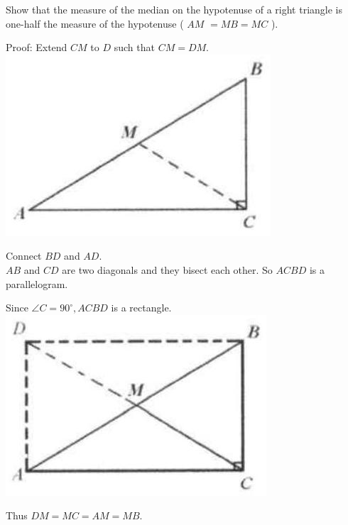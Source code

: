 \documentclass{article}
\begin{document}
Show that the measure of the median on the hypotenuse of a right triangle is one-half the measure of the hypotenuse ( \(A M\) \(=M B=M C\) ).

Proof:
Extend \(C M\) to \(D\) such that \(C M=D M\).\\
\centering
\includegraphics[width=\textwidth]{images/024(2).jpg}

Connect \(B D\) and \(A D\).\\
\(A B\) and \(C D\) are two diagonals and they bisect each other. So \(A C B D\) is a parallelogram.

Since \(\angle C=90^{\circ}, A C B D\) is a rectangle.\\
\centering
\includegraphics[width=\textwidth]{images/024(1).jpg}

Thus \(D M=M C=A M=M B\).
\end{document}
